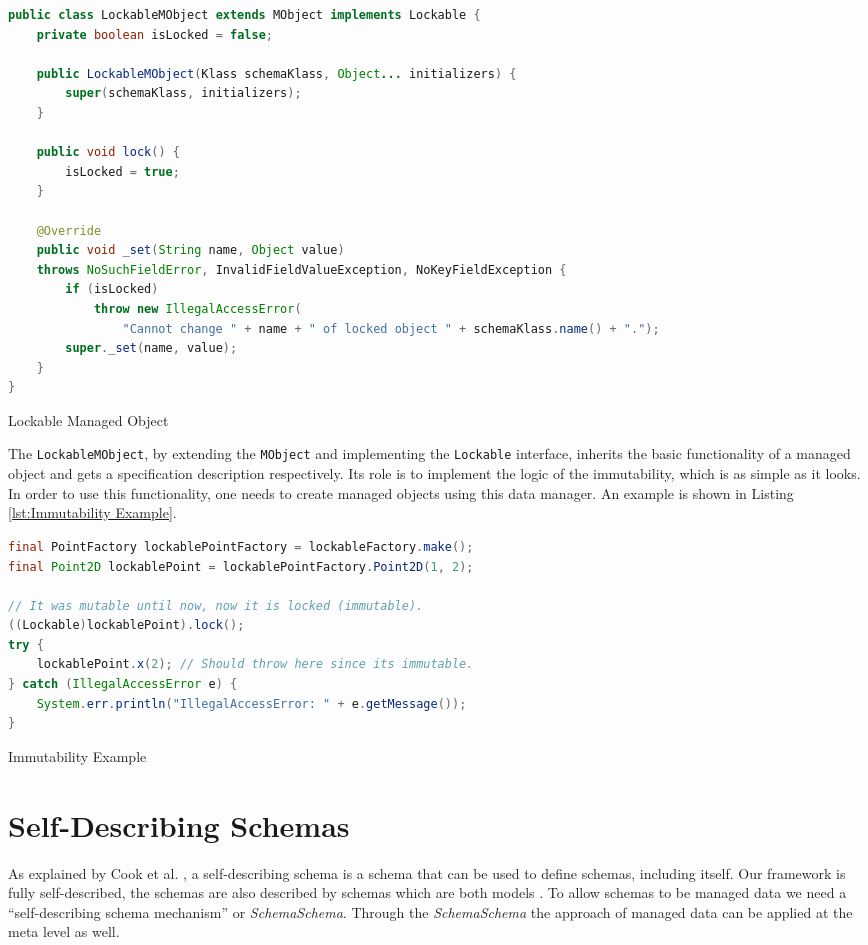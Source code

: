 \begin{sourcecode} [H]
	\begin{lstlisting}[language=Java, escapechar=|]
public class LockableMObject extends MObject implements Lockable {
	private boolean isLocked = false;

	public LockableMObject(Klass schemaKlass, Object... initializers) {
		super(schemaKlass, initializers);
	}

	public void lock() {
		isLocked = true;
	}

	@Override
	public void _set(String name, Object value) 
	throws NoSuchFieldError, InvalidFieldValueException, NoKeyFieldException {
		if (isLocked)
	    	throw new IllegalAccessError(
	    		"Cannot change " + name + " of locked object " + schemaKlass.name() + ".");
		super._set(name, value);
	}
}
	\end{lstlisting}
	\caption{Lockable Managed Object}
	\label{lst:Lockable Managed Object}
\end{sourcecode}

The \texttt{LockableMObject}, by extending the \texttt{MObject} and implementing the \texttt{Lockable} interface, inherits the basic functionality of a managed object and gets a specification description respectively.
Its role is to implement the logic of the immutability, which is as simple as it looks.
In order to use this functionality, one needs to create managed objects using this data manager.
An example is shown in Listing \ref{lst:Immutability Example}.

\begin{sourcecode} [H]
	\begin{lstlisting}[language=Java, escapechar=|]
final PointFactory lockablePointFactory = lockableFactory.make();
final Point2D lockablePoint = lockablePointFactory.Point2D(1, 2);

// It was mutable until now, now it is locked (immutable).
((Lockable)lockablePoint).lock();
try {
	lockablePoint.x(2); // Should throw here since its immutable.
} catch (IllegalAccessError e) {
	System.err.println("IllegalAccessError: " + e.getMessage());
}
	\end{lstlisting}
	\caption{Immutability Example}
	\label{lst:Immutability Example}
\end{sourcecode}

\section{Self-Describing Schemas}\label{Self-Describing Schemas}
As explained by Cook et al. \cite{loh2012managed}, a self-describing schema is a schema that can be used to define schemas, including itself.
Our framework is fully self-described, the schemas are also described by schemas which are both models \cite{kurtev2006model}. 
To allow schemas to be managed data we need a ``self-describing schema mechanism'' or \textit{SchemaSchema}.
Through the \textit{SchemaSchema} the approach of managed data can be applied at the meta level as well.

